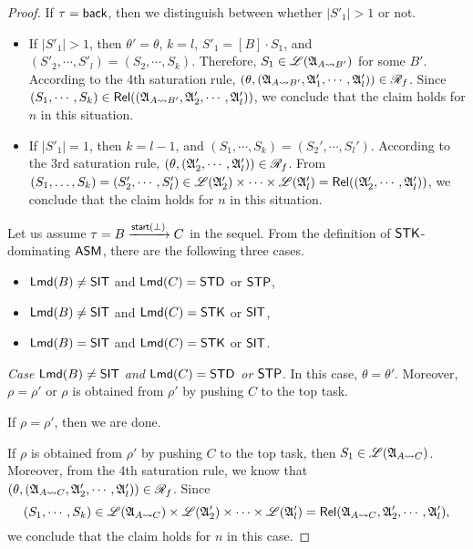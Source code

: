 \begin{proof}
If $\tau = {\mathsf{back} }$, then we distinguish between whether $|S'_1| > 1$ or not. 
\begin{itemize}
\item If $|S'_1| > 1$, then $\theta' = \theta$, $k=l$, $S'_1 = [B] \cdot S_1$, and $(S'_2, \cdots, S'_l) = (S_2, \cdots, S_k)$. 
Therefore, $S_1 \in {\mathscr{L} }({\mathfrak{A} }_{A \rightsquigarrow B'})$ for some $B'$. According to the 4th saturation rule, $(\theta, ({\mathfrak{A} }_{A \rightsquigarrow B'}, {\mathfrak{A} }'_1, \cdots, {\mathfrak{A} }'_l)) \in \mathscr{R}_f$. Since $(S_1, \cdots, S_k) \in \mathsf{Rel}(({\mathfrak{A} }_{A \rightsquigarrow B'}, {\mathfrak{A} }'_2, \cdots, {\mathfrak{A} }'_l))$, we conclude that the claim holds for $n$ in this situation. 
%
\item If $|S'_1| = 1$, then $k = l - 1$, and $(S_1,\cdots,S_k) = (S_2',\cdots,S_l')$. According to the 3rd saturation rule, $(\theta, ({\mathfrak{A} }_2',\cdots,{\mathfrak{A} }_l')) \in \mathscr{R}_f$. From $(S_1,\dots,S_k) = (S'_2, \cdots, S'_l) \in {\mathscr{L} }({\mathfrak{A} }_2') \times \cdots \times {\mathscr{L} }({\mathfrak{A} }_l') = \mathsf{Rel}(({\mathfrak{A} }'_2, \cdots, {\mathfrak{A} }'_l))$, we conclude that the claim holds for $n$ in this situation. 
\end{itemize}


Let us assume $\tau = B \xrightarrow{{\mathsf{start} }(\bot)} C$ in the sequel. From the definition of ${\sf STK}$-dominating $\textsf{ASM}$, there are the following three cases. 
\begin{itemize}
\item ${\sf Lmd}(B) \neq {\sf SIT}$ and ${\sf Lmd}(C) = {\sf STD}$ or ${\sf STP}$, 
%
\item ${\sf Lmd}(B) \neq {\sf SIT}$ and ${\sf Lmd}(C) = {\sf STK}$ or ${\sf SIT}$, 
%
\item ${\sf Lmd}(B) = {\sf SIT}$ and ${\sf Lmd}(C) = {\sf STK}$ or ${\sf SIT}$. 
\end{itemize}

\smallskip

\noindent \emph{Case ${\sf Lmd}(B) \neq {\sf SIT}$ and ${\sf Lmd}(C) = {\sf STD}$ or ${\sf STP}$}. In this case, $\theta = \theta'$. Moreover, $\rho = \rho'$ or $\rho$ is obtained from $\rho'$ by pushing $C$ to the top task.

If $\rho = \rho'$, then we are done. 

If $\rho$ is obtained from $\rho'$ by pushing $C$ to the top task, then $S_1 \in {\mathscr{L} }({\mathfrak{A} }_{A \rightsquigarrow C})$. Moreover, from the 4th saturation rule, we know that $(\theta, ({\mathfrak{A} }_{A \rightsquigarrow C}, {\mathfrak{A} }'_2, \cdots, {\mathfrak{A} }'_l)) \in \mathscr{R}_f$. 
Since 
$$(S_1, \cdots, S_k) \in {\mathscr{L} }({\mathfrak{A} }_{A \rightsquigarrow C}) \times {\mathscr{L} }({\mathfrak{A} }'_2) \times \cdots \times {\mathscr{L} }({\mathfrak{A} }'_l) = \mathsf{Rel}({\mathfrak{A} }_{A \rightsquigarrow C}, {\mathfrak{A} }'_2, \cdots, {\mathfrak{A} }'_l),$$ 
we conclude that the claim holds for $n$ in this case. 


\end{proof}
